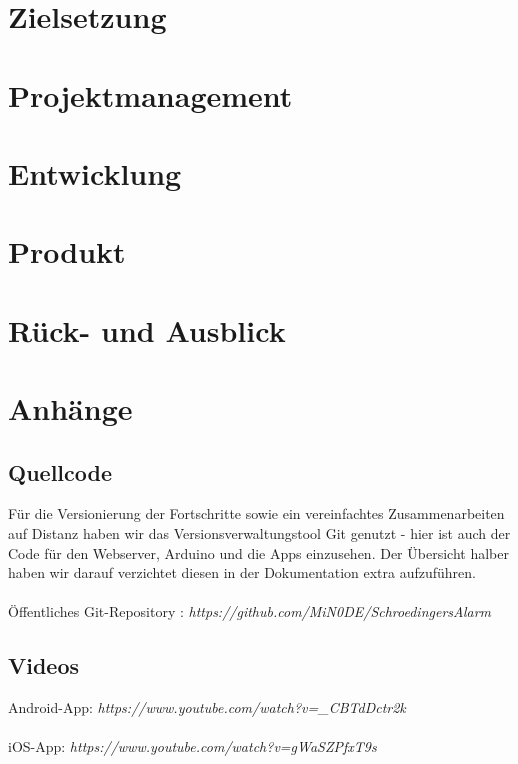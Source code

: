 \documentclass[11pt,a4paper,ngerman]{report}
\begin{document}
	
	
	\chapter{Zielsetzung}
	
	\clearpage
	
	\chapter{Projektmanagement}
		
		
	\chapter{Entwicklung}
	
		
			
		
    \chapter{Produkt}
	
	\chapter{Rück- und Ausblick}
	
	
	\chapter{Anhänge}
	\section{Quellcode}
	Für die Versionierung der Fortschritte sowie ein vereinfachtes Zusammenarbeiten auf Distanz haben wir das Versionsverwaltungstool Git genutzt - hier ist auch der Code für den Webserver, Arduino und die Apps einzusehen. Der Übersicht halber haben wir darauf verzichtet diesen in der Dokumentation extra aufzuführen. 
	\\
	\\
	Öffentliches Git-Repository : \textit{https://github.com/MiN0DE/SchroedingersAlarm}
	\section{Videos}
	Android-App: \textit{https://www.youtube.com/watch?v=\_CBTdDctr2k}
	\\
	\\
	iOS-App: \textit{https://www.youtube.com/watch?v=gWaSZPfxT9s} 

	
	
	\listoffigures
	\printbibliography[heading=bibintoc, title={Quellenverzeichnis}]
\end{document}
